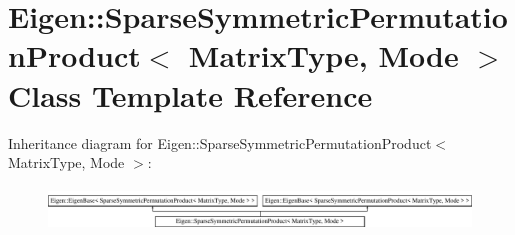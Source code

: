 \hypertarget{class_eigen_1_1_sparse_symmetric_permutation_product}{}\section{Eigen\+:\+:Sparse\+Symmetric\+Permutation\+Product$<$ Matrix\+Type, Mode $>$ Class Template Reference}
\label{class_eigen_1_1_sparse_symmetric_permutation_product}
Inheritance diagram for Eigen\+:\+:Sparse\+Symmetric\+Permutation\+Product$<$ Matrix\+Type, Mode $>$\+:\begin{figure}[H]
\begin{center}
\leavevmode
\includegraphics[height=1.171548cm]{class_eigen_1_1_sparse_symmetric_permutation_product}
\end{center}
\end{figure}
